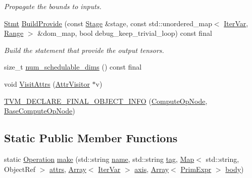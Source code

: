 \begin{DoxyCompactItemize}
\begin{DoxyCompactList}\small\item\em Propagate the bounds to inputs. \end{DoxyCompactList}\item 
\hyperlink{classtvm_1_1tir_1_1Stmt}{Stmt} \hyperlink{classtvm_1_1te_1_1ComputeOpNode_aac1774ef277c75bfdd8f6fdfe2aab4ab}{Build\+Provide} (const \hyperlink{classtvm_1_1te_1_1Stage}{Stage} \&stage, const std\+::unordered\+\_\+map$<$ \hyperlink{classtvm_1_1tir_1_1IterVar}{Iter\+Var}, \hyperlink{classtvm_1_1Range}{Range} $>$ \&dom\+\_\+map, bool debug\+\_\+keep\+\_\+trivial\+\_\+loop) const final
\begin{DoxyCompactList}\small\item\em Build the statement that provide the output tensors. \end{DoxyCompactList}\item 
size\+\_\+t \hyperlink{classtvm_1_1te_1_1ComputeOpNode_adafbc09da5da3629aef87a8e5145bdec}{num\+\_\+schedulable\+\_\+dims} () const final
\item 
void \hyperlink{classtvm_1_1te_1_1ComputeOpNode_a76272ae11403d194fb01121f26680fd0}{Visit\+Attrs} (\hyperlink{classtvm_1_1AttrVisitor}{Attr\+Visitor} $\ast$v)
\item 
\hyperlink{classtvm_1_1te_1_1ComputeOpNode_a2788e8b3cfe7863f6fe44711e92bfd34}{T\+V\+M\+\_\+\+D\+E\+C\+L\+A\+R\+E\+\_\+\+F\+I\+N\+A\+L\+\_\+\+O\+B\+J\+E\+C\+T\+\_\+\+I\+N\+FO} (\hyperlink{classtvm_1_1te_1_1ComputeOpNode}{Compute\+Op\+Node}, \hyperlink{classtvm_1_1te_1_1BaseComputeOpNode}{Base\+Compute\+Op\+Node})
\end{DoxyCompactItemize}
\subsection*{Static Public Member Functions}
\begin{DoxyCompactItemize}
\item 
static \hyperlink{classtvm_1_1te_1_1Operation}{Operation} \hyperlink{classtvm_1_1te_1_1ComputeOpNode_a1e2b9193508377af45861422c6045ad8}{make} (std\+::string \hyperlink{classtvm_1_1te_1_1OperationNode_ad2fd6f140257f7b3c311f88374fa74d2}{name}, std\+::string \hyperlink{classtvm_1_1te_1_1OperationNode_ae6ac4336e7dc2df84f128fc97a6cdb9b}{tag}, \hyperlink{classtvm_1_1Map}{Map}$<$ std\+::string, Object\+Ref $>$ \hyperlink{classtvm_1_1te_1_1OperationNode_a009ebd67a59953ec9a587f9724afd538}{attrs}, \hyperlink{classtvm_1_1Array}{Array}$<$ \hyperlink{classtvm_1_1tir_1_1IterVar}{Iter\+Var} $>$ \hyperlink{classtvm_1_1te_1_1BaseComputeOpNode_a21617a643897727c51ded2b7260df4c3}{axis}, \hyperlink{classtvm_1_1Array}{Array}$<$ \hyperlink{classtvm_1_1PrimExpr}{Prim\+Expr} $>$ \hyperlink{classtvm_1_1te_1_1ComputeOpNode_a1486068943f10fbf785ede621c15ed74}{body})
\end{DoxyCompactItemize}
